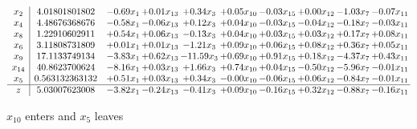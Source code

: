 \documentclass[9pt]{article}
\begin{document}
 \[\begin{array}{c| c c@{\hskip 2pt} c@{\hskip 2pt} c@{\hskip 2pt} c@{\hskip 2pt} c@{\hskip 2pt} c@{\hskip 2pt} c@{\hskip 2pt} c@{\hskip 2pt} }
 x_{2}   &  4.01801801802 & -0.69 x_{1} & +  0.01 x_{13} & +  0.34 x_{3} & +  0.05 x_{10} & -0.03 x_{15} & +  0.00 x_{12} & -1.03 x_{7} & -0.07 x_{11}\\
 x_{4}   &  4.48676368676 & -0.58 x_{1} & -0.06 x_{13} & +  0.12 x_{3} & +  0.04 x_{10} & -0.03 x_{15} & -0.04 x_{12} & -0.18 x_{7} & -0.03 x_{11}\\
 x_{8}   &  1.22910602911 & +  0.54 x_{1} & +  0.06 x_{13} & -0.13 x_{3} & +  0.04 x_{10} & +  0.03 x_{15} & +  0.03 x_{12} & +  0.17 x_{7} & +  0.08 x_{11}\\
 x_{6}   &  3.11808731809 & +  0.01 x_{1} & +  0.01 x_{13} & -1.21 x_{3} & +  0.09 x_{10} & +  0.06 x_{15} & +  0.08 x_{12} & +  0.36 x_{7} & +  0.05 x_{11}\\
 x_{9}   &  17.1133749134 & -3.83 x_{1} & +  0.62 x_{13} & -11.59 x_{3} & +  0.69 x_{10} & +  0.91 x_{15} & +  0.18 x_{12} & -4.37 x_{7} & +  0.43 x_{11}\\
 x_{14}   &  40.8623700624 & -8.16 x_{1} & +  0.03 x_{13} & +  1.66 x_{3} & +  0.74 x_{10} & +  0.04 x_{15} & -0.50 x_{12} & -5.96 x_{7} & -0.01 x_{11}\\
 x_{5}   &  0.563132363132 & +  0.51 x_{1} & +  0.03 x_{13} & +  0.34 x_{3} & -0.00 x_{10} & -0.06 x_{15} & +  0.06 x_{12} & -0.84 x_{7} & -0.01 x_{11}\\
\hline
z    &  5.03007623008 & -3.82 x_{1} & -0.24 x_{13} & -0.41 x_{3} & +  0.09 x_{10} & -0.16 x_{15} & +  0.32 x_{12} & -0.88 x_{7} & -0.16 x_{11}\\
\end{array}\]


 $ x_{10} $ enters and $ x_{5} $ leaves 
\end{document}
